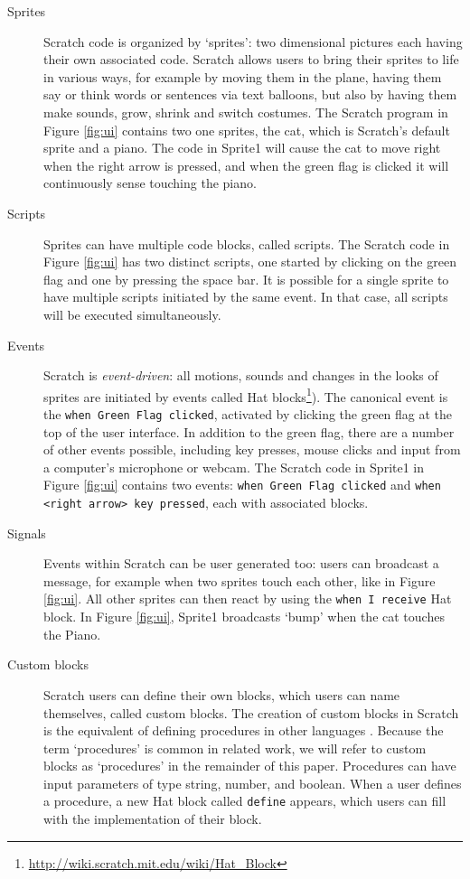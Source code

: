 \documentclass[preprint]{sigplanconf}
\begin{document}
\begin{description}
	\item [Sprites] Scratch code is organized by `sprites': two dimensional pictures each having their own associated code. Scratch allows users to bring their sprites to life in various ways, for example by moving them in the plane, having them say or think words or sentences via text balloons, but also by having them make sounds, grow, shrink and switch costumes. The Scratch program in Figure \ref{fig:ui} contains two one sprites, the cat, which is Scratch's default sprite and a piano. The code in Sprite1 will cause the cat to move right when the right arrow is pressed, and when the green flag is clicked it will continuously sense touching the piano.
	\item [Scripts]Sprites can have multiple code blocks, called scripts. The Scratch code in Figure \ref{fig:ui} has two distinct scripts, one started by clicking on the green flag and one by pressing the space bar. It is possible for a single sprite to have multiple scripts initiated by the same event. In that case, all scripts will be executed simultaneously.
	\item [Events] Scratch is \emph{event-driven}: all motions, sounds and changes in the looks of sprites are initiated by events called Hat blocks\footnote{\url{http://wiki.scratch.mit.edu/wiki/Hat_Block}}). The canonical event is the \texttt{when Green Flag clicked}, activated by clicking the green flag at the top of the user interface. In addition to the green flag, there are a number of other events possible, including key presses, mouse clicks and input from a computer's microphone or webcam. The Scratch code in Sprite1 in Figure \ref{fig:ui} contains two events: \texttt{when Green Flag clicked} and \texttt{when <right arrow> key pressed}, each with associated blocks.
	\item [Signals] Events within Scratch can be user generated too: users can broadcast a message, for example when two sprites touch each other, like in Figure \ref{fig:ui}. All other sprites can then react by using the \texttt{when I receive} Hat block. In Figure \ref{fig:ui}, Sprite1 broadcasts `bump' when the cat touches the Piano. 
	\item[Custom blocks] Scratch users can define their own blocks, which users can name themselves, called custom blocks. The creation of custom blocks in Scratch is the equivalent of defining procedures in other languages \cite{moreno_automatic_2014}. Because the term `procedures' is common in related work, we will refer to custom blocks as `procedures' in the remainder of this paper. Procedures can have input parameters of type string, number, and boolean. When a user defines a procedure, a new Hat block called \texttt{define} appears, which users can fill with the implementation of their block.
\end{description}
\end{document}
